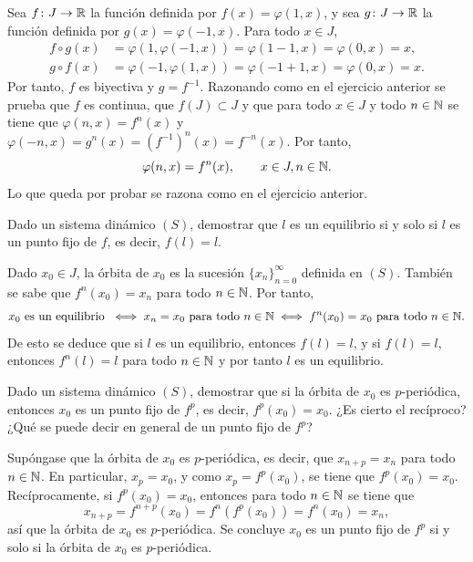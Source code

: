 \documentclass[11pt]{report}
\begin{document}
\begin{solution}
    Sea $f \colon J \to \mathbb R$ la función definida por $f(x) = \varphi(1,x)$, y sea $g \colon J \to \mathbb R$ la función definida por $g(x) = \varphi(-1,x)$. Para todo $x \in J$,
    \begin{align*}
        f \circ g(x) &= \varphi(1,\varphi(-1,x)) = \varphi(1-1,x) = \varphi(0,x) = x, \\
        g \circ f(x) &= \varphi(-1,\varphi(1,x)) = \varphi(-1+1,x) = \varphi(0,x) = x.
    \end{align*}
    Por tanto, $f$ es biyectiva y $g = f^{-1}$. Razonando como en el ejercicio anterior se prueba que $f$ es continua, que $f(J) \subset J$ y que para todo $x \in J$ y todo $n \in \mathbb N$ se tiene que $\varphi(n,x) = f^n(x)$ y $\varphi(-n,x) = g^n(x) = (f^{-1})^n(x) = f^{-n}(x)$. Por tanto,
    \[\varphi(n,x) = f^n(x), \qquad x \in J, n \in \mathbb N.\]
    Lo que queda por probar se razona como en el ejercicio anterior.
\end{solution}

\begin{exercise}
    Dado un sistema dinámico $(S)$, demostrar que $l$ es un equilibrio si y solo si $l$ es un punto fijo de $f$, es decir, $f(l) = l$.
\end{exercise}

\begin{solution}
    Dado $x_0 \in J$, la órbita de $x_0$ es la sucesión $\{x_{n}\}_{n=0}^\infty$ definida en $(S)$. También se sabe que $f^n(x_0) = x_n$ para todo $n \in \mathbb N$. Por tanto,
    \[x_0 \textup{ es un equilibrio } \iff x_n = x_0 \textup{ para todo } n \in \mathbb N \iff f^n(x_0) = x_0 \textup{ para todo } n \in \mathbb N.\]
    De esto se deduce que si $l$ es un equilibrio, entonces $f(l) = l$, y si $f(l) = l$, entonces $f^n(l) = l$ para todo $n \in \mathbb N$ y por tanto $l$ es un equilibrio.
\end{solution}

\begin{exercise}
    Dado un sistema dinámico $(S)$, demostrar que si la órbita de $x_0$ es $p$-periódica, entonces $x_0$ es un punto fijo de $f^p$, es decir, $f^p(x_0) = x_0$. ¿Es cierto el recíproco? ¿Qué se puede decir en general de un punto fijo de $f^p$?
\end{exercise}

\begin{solution}
    Supóngase que la órbita de $x_0$ es $p$-periódica, es decir, que $x_{n+p} = x_n$ para todo $n \in \mathbb N$. En particular, $x_p = x_0$, y como $x_p = f^p(x_0)$, se tiene que $f^p(x_0) = x_0$. Recíprocamente, si $f^p(x_0) = x_0$, entonces para todo $n \in \mathbb N$ se tiene que
    \[x_{n+p} = f^{n+p}(x_0) = f^n(f^p(x_0)) = f^n(x_0) = x_n,\]
    así que la órbita de $x_0$ es $p$-periódica. Se concluye $x_0$ es un punto fijo de $f^p$ si y solo si la órbita de $x_0$ es $p$-periódica.
\end{solution}
\end{document}
